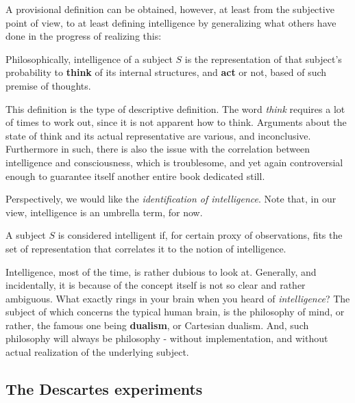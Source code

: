 A provisional definition can be obtained, however, at least from the subjective point of view, to at least defining intelligence by generalizing what others have done in the progress of realizing this: 

\begin{definition}\label{def:intel1}
    Philosophically, intelligence of a subject $S$ is the representation of that subject's probability to \textbf{think} of its internal structures, and \textbf{act} or not, based of such premise of thoughts.
\end{definition}

This definition is the type of descriptive definition. The word \textit{think} requires a lot of times to work out, since it is not apparent how to think. Arguments about the state of think and its actual representative are various, and inconclusive. Furthermore in such, there is also the issue with the correlation between intelligence and consciousness, which is troublesome, and yet again controversial enough to guarantee itself another entire book dedicated still. 

Perspectively, we would like the \textit{identification of intelligence}. Note that, in our view, intelligence is an umbrella term, for now. 

\begin{definition}
    A subject $S$ is considered intelligent if, for certain proxy of observations, fits the set of representation that correlates it to the notion of intelligence. 
\end{definition}

Intelligence, most of the time, is rather dubious to look at. Generally, and incidentally, it is because of the concept itself is not so clear and rather ambiguous. What exactly rings in your brain when you heard of \textit{intelligence}? The subject of which concerns the typical human brain, is the philosophy of mind, or rather, the famous one being \textbf{dualism}, or Cartesian dualism. And, such philosophy will always be philosophy - without implementation, and without actual realization of the underlying subject. 

\subsection{The Descartes experiments}

